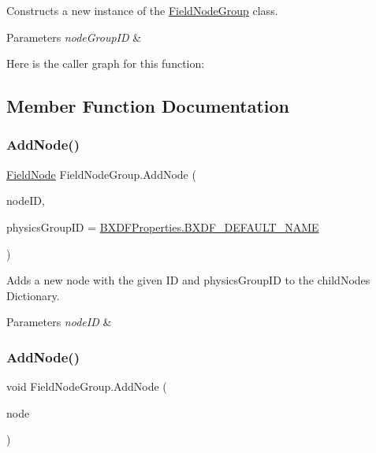 Constructs a new instance of the \hyperlink{class_field_node_group}{Field\+Node\+Group} class. 


\begin{DoxyParams}{Parameters}
{\em node\+Group\+ID} & \\
\hline
\end{DoxyParams}
Here is the caller graph for this function\+:


\subsection{Member Function Documentation}
\mbox{\label{class_field_node_group_afb8a937c5cafe84b04c29b87a5543f5e}} 
\subsubsection{\texorpdfstring{Add\+Node()}{AddNode()}\hspace{0.1cm}{\footnotesize\ttfamily [1/2]}}
{\footnotesize\ttfamily \hyperlink{class_field_node}{Field\+Node} Field\+Node\+Group.\+Add\+Node (\begin{DoxyParamCaption}\item[{string}]{node\+ID,  }\item[{string}]{physics\+Group\+ID = {\ttfamily \hyperlink{class_b_x_d_f_properties_a528bb431080585f72f9f74bd44a23932}{B\+X\+D\+F\+Properties.\+B\+X\+D\+F\+\_\+\+D\+E\+F\+A\+U\+L\+T\+\_\+\+N\+A\+ME}} }\end{DoxyParamCaption})}



Adds a new node with the given ID and physics\+Group\+ID to the child\+Nodes Dictionary. 


\begin{DoxyParams}{Parameters}
{\em node\+ID} & \\
\hline
\end{DoxyParams}
\mbox{\label{class_field_node_group_a28cf2a8b3f3bf5f98146d8ade421bdb7}} 
\subsubsection{\texorpdfstring{Add\+Node()}{AddNode()}\hspace{0.1cm}{\footnotesize\ttfamily [2/2]}}
{\footnotesize\ttfamily void Field\+Node\+Group.\+Add\+Node (\begin{DoxyParamCaption}\item[{\hyperlink{class_field_node}{Field\+Node}}]{node }\end{DoxyParamCaption})}



